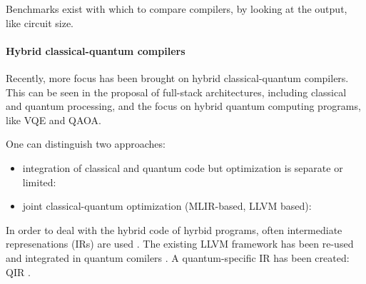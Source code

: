Benchmarks exist with which to compare compilers, by looking at the output, like circuit size.

\paragraph{Hybrid classical-quantum compilers}
Recently, more focus has been brought on hybrid classical-quantum compilers.
This can be seen in the proposal of full-stack architectures, including classical and quantum processing\cite{murali_full-stack_2019, khammassi_openql_2021, mccaskey_xacc_2020}, and the focus on hybrid quantum computing programs, like VQE and QAOA. 

One can distinguish two approaches:
\begin{itemize}
\item integration of classical and quantum code but optimization is separate or limited: \cite{litteken_updated_2020, fux_quingo_2021, khalate_llvm-based_2022, younis_quantum_2022}
\item joint classical-quantum optimization (MLIR-based, LLVM based): \cite{mccaskey_mlir_2021, ittah_enabling_2022, nguyen_retargetable_2022, peduri_qssa_2022}
\end{itemize}

In order to deal with the hybrid code of hyrbid programs, often intermediate represenations (IRs) are used \cite{nigam_compiler_2021, nishio_inquir_2023}.
The existing LLVM framework has been re-used and integrated in quantum comilers \cite{murali_noise-adaptive_2019, murali_full-stack_2019, litteken_updated_2020}.
A quantum-specific IR has been created: QIR \cite{haner_software_2018, geller_introducing_2020}.






